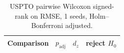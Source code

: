 \begin{table}[t]
\centering
\small
\caption{USPTO pairwise Wilcoxon signed-rank on RMSE, 1 seeds, Holm--Bonferroni adjusted.}
\label{tab:uspto_random_pw}
\begin{tabular}{lrrc}
\toprule
Comparison & $p_{\mathrm{adj}}$ & $d_z$ & reject $H_0$ \\
\midrule
\bottomrule
\end{tabular}
\end{table}
